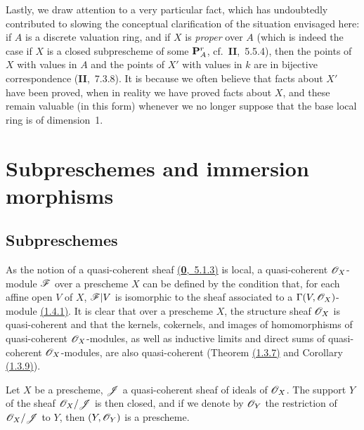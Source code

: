 \begin{env}[3.7.3]
\label{env-1.3.7.3}
Lastly, we draw attention to a very particular fact, which has undoubtedly contributed to slowing the conceptual clarification of the situation envisaged here: if $A$ is a discrete valuation ring, and if $X$ is \emph{proper} over $A$ (which is indeed the case if $X$ is a closed subprescheme of some $\mathbf{P}_A^r$, cf.~\textbf{II},~5.5.4), then the points of $X$ with values in $A$ and the points of $X'$ with values in $k$ are in bijective correspondence (\textbf{II},~7.3.8).
It is because we often believe that facts about $X'$ have been proved, when in reality we have proved facts about $X$, and these remain valuable (in this form) whenever we no longer suppose that the base local ring is of dimension~1.
\end{env}

\section{Subpreschemes and immersion morphisms}
\label{section-subpreschemes-and-immersion-morphisms}

\subsection{Subpreschemes}
\label{subsection-subpreschemes}

\begin{env}[4.1.1]
\label{env-1.4.1.1}
As the notion of a quasi-coherent sheaf \hyperref[env-0.5.1.3]{(\textbf{0},~5.1.3)} is local,
a quasi-coherent $\mathscr{O}_X$-module $\mathscr{F}$ over a prescheme $X$ can be defined by the condition
that, for each affine open $V$ of $X$, $\mathscr{F}|V$ is isomorphic to the sheaf associated to a
$\Gamma(V,\mathscr{O}_X)$-module \hyperref[thm-1.1.4.1]{(1.4.1)}. It is clear that over a prescheme
$X$, the structure sheaf $\mathscr{O}_X$ is quasi-coherent and that the kernels, cokernels, and
images of homomorphisms of quasi-coherent $\mathscr{O}_X$-modules, as well as inductive limits and
direct sums of quasi-coherent $\mathscr{O}_X$-modules, are also quasi-coherent
(Theorem \hyperref[thm-1.1.3.7]{(1.3.7)} and Corollary \hyperref[cor-1.1.3.9]{(1.3.9)}).
\end{env}

\begin{prop}[4.1.2]
\label{prop-1.4.1.2}
Let $X$ be a prescheme, $\mathscr{J}$ a quasi-coherent sheaf of ideals of $\mathscr{O}_X$. The support
$Y$ of the sheaf $\mathscr{O}_X/\mathscr{J}$ is then closed, and if we denote by $\mathscr{O}_Y$ the restriction
of $\mathscr{O}_X/\mathscr{J}$ to $Y$, then $(Y,\mathscr{O}_Y)$ is a prescheme.
\end{prop}

